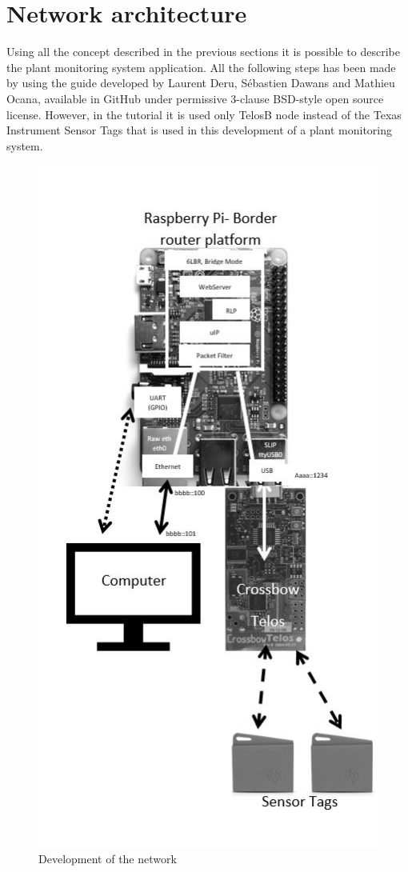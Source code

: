 \section{Network architecture}
Using all the concept described in the previous sections it is possible to describe the plant monitoring system application. All the following steps has been made by using the guide developed by Laurent Deru, Sébastien Dawans and Mathieu Ocana, available in GitHub under permissive 3-clause BSD-style open source license. However, in the tutorial it is used only TelosB node instead of the Texas Instrument Sensor Tags that is used in this development of a plant monitoring system.\\
\begin{figure}[!h]
	\includegraphics[width=\linewidth]{Network}
	\caption{Development of the network}
	\label{fig:Network}
\end{figure}
